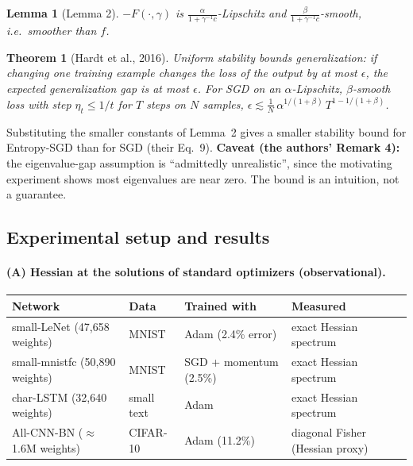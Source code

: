 \documentclass[11pt]{article}
\theoremstyle{plain}
\newtheorem{theorem}{Theorem}
\newtheorem{lemma}{Lemma}
\begin{document}
\begin{lemma}[Lemma 2]
$-F(\cdot,\gamma)$ is $\frac{\alpha}{1+\gamma^{-1}c}$-Lipschitz and $\frac{\beta}{1+\gamma^{-1}c}$-smooth, i.e.\ smoother than $f$.
\end{lemma}

\begin{theorem}[Hardt et al., 2016]
Uniform stability bounds generalization: if changing one training example changes the loss of the output by at most $\epsilon$, the expected
generalization gap is at most $\epsilon$. For SGD on an $\alpha$-Lipschitz, $\beta$-smooth loss with step $\eta_t \le 1/t$ for $T$ steps on $N$ samples,
$\epsilon \lesssim \frac1N\, \alpha^{1/(1+\beta)}\, T^{1 - 1/(1+\beta)}$.
\end{theorem}

Substituting the smaller constants of Lemma~2 gives a smaller stability bound for Entropy-SGD than for SGD (their Eq.~9).
\textbf{Caveat (the authors' Remark 4):} the eigenvalue-gap assumption is ``admittedly unrealistic'', since the motivating experiment shows
most eigenvalues are near zero. The bound is an intuition, not a guarantee.

\subsection{Experimental setup and results}
\label{sec:esgd-setup}

\paragraph{(A) Hessian at the solutions of standard optimizers (observational).}
\begin{center}\small
\begin{tabularx}{\textwidth}{@{}p{4.0cm}p{2.2cm}p{2.6cm}L@{}}
\toprule
\textbf{Network} & \textbf{Data} & \textbf{Trained with} & \textbf{Measured} \\
\midrule
small-LeNet (47,658 weights) & MNIST & Adam (2.4\% error) & exact Hessian spectrum \\
small-mnistfc (50,890 weights) & MNIST & SGD + momentum (2.5\%) & exact Hessian spectrum \\
char-LSTM (32,640 weights) & small text & Adam & exact Hessian spectrum \\
All-CNN-BN ($\approx$1.6M weights) & CIFAR-10 & Adam (11.2\%) & diagonal Fisher (Hessian proxy) \\
\bottomrule
\end{tabularx}
\end{center}
\end{document}

